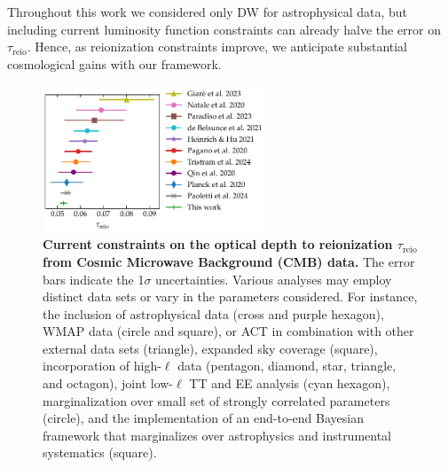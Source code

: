 \documentclass[12pt]{article}
\newcommand{\reio}{\mathrm{reio}}
\begin{document}
Throughout this work we considered only DW for astrophysical data,
but including current luminosity function constraints can already halve
the error on $\tau_\reio$.
Hence, as reionization constraints improve, we anticipate substantial
cosmological gains with our framework.




\begin{figure}
\centering
\includegraphics[width=0.6\textwidth]{figs/FIG1.pdf}
\caption{\textbf{\boldmath Current constraints on the optical depth to
reionization $\tau_\reio$ from Cosmic Microwave Background (CMB) data.}
The error bars indicate the 1$\sigma$ uncertainties.
Various analyses may employ distinct data sets or vary in the parameters
considered.
For instance, the inclusion of astrophysical data \cite{Qin2020,
Paoletti2024} (cross and purple hexagon), WMAP data \cite{Natale2020,
Paradiso2023} (circle and square), or ACT in combination with other
external data sets \cite{Giare2023} (triangle), expanded sky coverage
\cite{Paradiso2023} (square), incorporation of high-$\ell$ data
\cite{Pagano2020, Planck2020a, HeinrichHu2021, Giare2023, Tristram2024}
(pentagon, diamond, star, triangle, and octagon), joint low-$\ell$ TT
and EE analysis \cite{deBelsunce2021} (cyan hexagon), marginalization
over small set of strongly correlated parameters \cite{Natale2020}
(circle), and the implementation of an end-to-end Bayesian framework
that marginalizes over astrophysics and instrumental systematics
\cite{Paradiso2023} (square).}
\label{fig:tau}
\end{figure}
\end{document}
